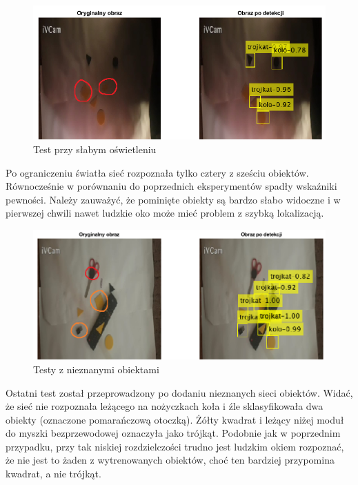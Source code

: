 \begin{figure}[H]
	\centering
	\includegraphics[width=15cm]{pages/uczenie/img/testyWynikSieci3SlabeOsw.png}
	\caption{Test przy słabym oświetleniu}
	\label{fig:testSieci3}
\end{figure}
Po ograniczeniu światła sieć rozpoznała tylko cztery z sześciu obiektów. 
Równocześnie w porównaniu do poprzednich eksperymentów spadły wskaźniki pewności.
Należy zauważyć, że pominięte obiekty są bardzo słabo widoczne i w pierwszej chwili
nawet ludzkie oko może mieć problem z szybką lokalizacją.
\begin{figure}[H]
	\centering
	\includegraphics[width=15cm]{pages/uczenie/img/testyWynikSieci4.png}
	\caption{Testy z nieznanymi obiektami}
\end{figure}
Ostatni test został przeprowadzony po dodaniu nieznanych sieci obiektów.
Widać, że sieć nie rozpoznała leżącego na nożyczkach koła i 
źle sklasyfikowała dwa obiekty (oznaczone pomarańczową otoczką). Żółty kwadrat i leżący niżej moduł do myszki bezprzewodowej 
oznaczyła jako trójkąt. Podobnie jak w poprzednim przypadku, przy tak niskiej rozdzielczości trudno jest 
ludzkim okiem rozpoznać, że nie jest to żaden z wytrenowanych obiektów, choć ten bardziej przypomina kwadrat, a nie trójkąt.
